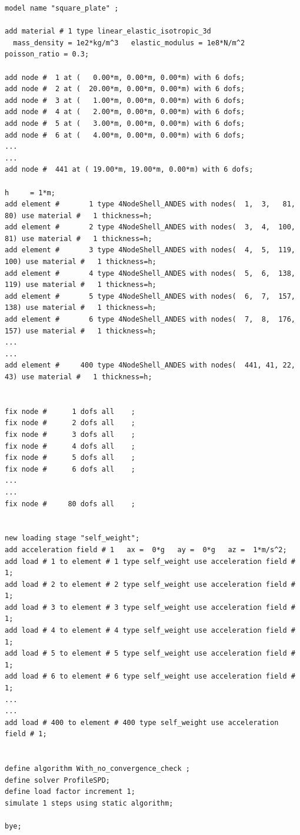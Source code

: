 \documentclass[fleqn,11pt]{article}
\begin{document}
%
\begin{lstlisting}
model name "square_plate" ;

add material # 1 type linear_elastic_isotropic_3d
  mass_density = 1e2*kg/m^3   elastic_modulus = 1e8*N/m^2   poisson_ratio = 0.3;

add node #  1 at (   0.00*m, 0.00*m, 0.00*m) with 6 dofs;
add node #  2 at (  20.00*m, 0.00*m, 0.00*m) with 6 dofs;
add node #  3 at (   1.00*m, 0.00*m, 0.00*m) with 6 dofs;
add node #  4 at (   2.00*m, 0.00*m, 0.00*m) with 6 dofs;
add node #  5 at (   3.00*m, 0.00*m, 0.00*m) with 6 dofs;
add node #  6 at (   4.00*m, 0.00*m, 0.00*m) with 6 dofs;
...
...
add node #  441 at ( 19.00*m, 19.00*m, 0.00*m) with 6 dofs;

h     = 1*m;       
add element #       1 type 4NodeShell_ANDES with nodes(  1,  3,   81,  80) use material #   1 thickness=h;
add element #       2 type 4NodeShell_ANDES with nodes(  3,  4,  100,  81) use material #   1 thickness=h;
add element #       3 type 4NodeShell_ANDES with nodes(  4,  5,  119, 100) use material #   1 thickness=h;
add element #       4 type 4NodeShell_ANDES with nodes(  5,  6,  138, 119) use material #   1 thickness=h;
add element #       5 type 4NodeShell_ANDES with nodes(  6,  7,  157, 138) use material #   1 thickness=h;
add element #       6 type 4NodeShell_ANDES with nodes(  7,  8,  176, 157) use material #   1 thickness=h;
...
...
add element #     400 type 4NodeShell_ANDES with nodes(  441, 41, 22,  43) use material #   1 thickness=h;


fix node #      1 dofs all    ;
fix node #      2 dofs all    ;
fix node #      3 dofs all    ;
fix node #      4 dofs all    ;
fix node #      5 dofs all    ;
fix node #      6 dofs all    ;
...
...
fix node #     80 dofs all    ;


new loading stage "self_weight";
add acceleration field # 1   ax =  0*g   ay =  0*g   az =  1*m/s^2;
add load # 1 to element # 1 type self_weight use acceleration field # 1;
add load # 2 to element # 2 type self_weight use acceleration field # 1;
add load # 3 to element # 3 type self_weight use acceleration field # 1;
add load # 4 to element # 4 type self_weight use acceleration field # 1;
add load # 5 to element # 5 type self_weight use acceleration field # 1;
add load # 6 to element # 6 type self_weight use acceleration field # 1;
...
...
add load # 400 to element # 400 type self_weight use acceleration field # 1;


define algorithm With_no_convergence_check ;
define solver ProfileSPD;
define load factor increment 1;
simulate 1 steps using static algorithm;

bye;
\end{lstlisting}
\end{document}
